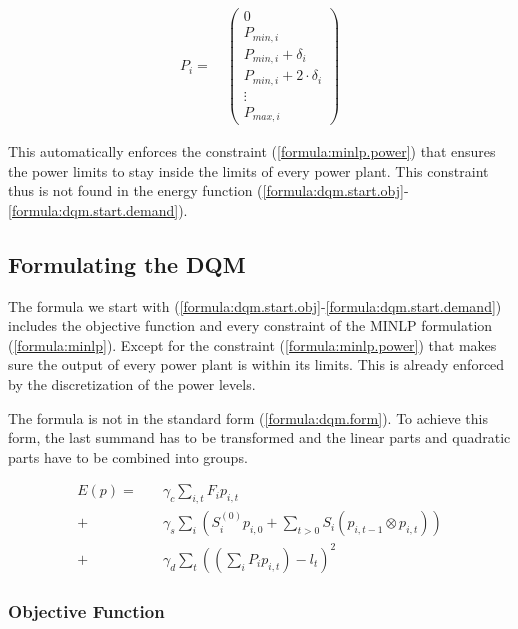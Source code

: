\begin{align}
  P_i =
  \quad \begin{pmatrix}
    0 \\
    P_{min, i} \\
    P_{min, i} + \delta_i \\
    P_{min, i} + 2 \cdot \delta_i \\
    \vdots \\
    P_{max, i}
  \end{pmatrix}
\end{align}

This automatically enforces the constraint (\ref{formula:minlp.power}) that ensures the power limits to stay inside the limits of every power plant.
This constraint thus is not found in the energy function (\ref{formula:dqm.start.obj}-\ref{formula:dqm.start.demand}).

\subsection{Formulating the DQM}

The formula we start with (\ref{formula:dqm.start.obj}-\ref{formula:dqm.start.demand})
includes the objective function and every constraint of the MINLP formulation (\ref{formula:minlp}).
Except for the constraint (\ref{formula:minlp.power}) that makes sure the output of every power plant is within its limits.
This is already enforced by the discretization of the power levels.

The formula is not in the standard form (\ref{formula:dqm.form}).
To achieve this form, the last summand has to be transformed and the linear parts and quadratic parts have to be combined into groups.

\begin{subequations}
\begin{align}
  E(p) =
  &  \quad \gamma_c \sum_{i, t} F_i p_{i, t}
  \label{formula:dqm.start.obj} \\
  + & \quad \gamma_s \sum_i \left(
      S_i^{(0)} p_{i, 0}
      + \sum_{t > 0} S_i \left( p_{i, t-1} \otimes p_{i, t} \right)
    \right)
  \label{formula:dqm.start.startup} \\
  + & \quad \gamma_d \sum_t \left( \left( \sum_i P_i p_{i, t} \right) - l_t \right)^2
  \label{formula:dqm.start.demand}
\end{align}
\end{subequations}

\subsubsection{Objective Function}

